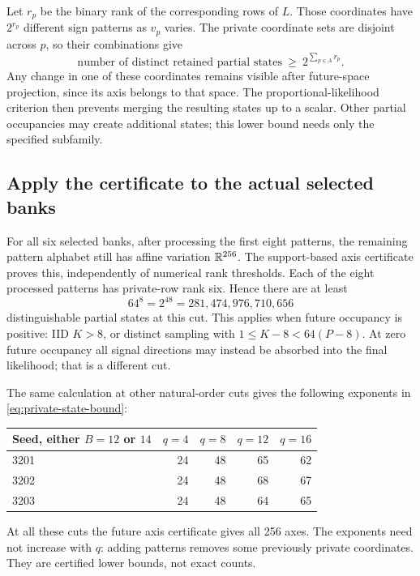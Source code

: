 \documentclass[10pt,a4paper]{article}
\begin{document}
Let $r_p$ be the binary rank of the corresponding rows of $L$. Those coordinates have $2^{r_p}$ different
sign patterns as $v_p$ varies. The private coordinate sets are disjoint across $p$, so their combinations give
\begin{equation}
 \boxed{\text{number of distinct retained partial states}\ \geq\
             2^{\sum_{p\in A}r_p}.}
 \label{eq:private-state-bound}
\end{equation}
Any change in one of these coordinates remains visible after future-space projection, since its axis belongs
to that space. The proportional-likelihood criterion then prevents merging the resulting states up to a scalar.
Other partial occupancies may create additional states; this lower bound needs only the specified subfamily.

\subsection{Apply the certificate to the actual selected banks}
For all six selected banks, after processing the first eight patterns, the remaining pattern alphabet still
has affine variation $\mathbb{R}^{256}$. The support-based axis certificate proves this, independently of numerical
rank thresholds. Each of the eight processed patterns has private-row rank six. Hence there are at least
\[
 64^8=2^{48}=281{,}474{,}976{,}710{,}656
\]
distinguishable partial states at this cut. This applies when future occupancy is positive: IID $K>8$, or
distinct sampling with $1\leq K-8<64(P-8)$. At zero future occupancy all signal directions may instead be
absorbed into the final likelihood; that is a different cut.

The same calculation at other natural-order cuts gives the following exponents in \eqref{eq:private-state-bound}:
\begin{center}
\begin{tabular}{@{}lrrrr@{}}\toprule
Seed, either $B=12$ or $14$ & $q=4$ & $q=8$ & $q=12$ & $q=16$\\\midrule
3201 & 24 & 48 & 65 & 62\\
3202 & 24 & 48 & 68 & 67\\
3203 & 24 & 48 & 64 & 65\\\bottomrule
\end{tabular}
\end{center}
At all these cuts the future axis certificate gives all 256 axes. The exponents need not increase with $q$:
adding patterns removes some previously private coordinates. They are certified lower bounds, not exact counts.
\end{document}
